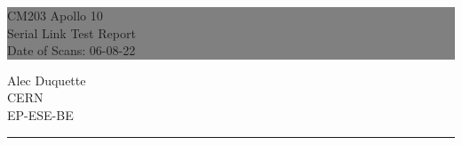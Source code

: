 \documentclass{report}
\newcommand\dateofscans{06-08-22} %
\begin{document}

\begin{titlepage} %
  
  
  \colorbox{grey}{
    \parbox[t]{0.93\textwidth}{ %
      \parbox[t]{0.91\textwidth}{ %
        \raggedleft %
        \fontsize{80pt}{40pt}\selectfont %
        \vspace{0.7cm} %

        CM203 Apollo 10\\
        Serial Link Test Report\\
        Date of Scans: \dateofscans\\
        
        \vspace{0.7cm} %
        }
      }
    }
  
  \vfill %
  
  
  \parbox[t]{0.93\textwidth}{ %
    \raggedleft %
    \large %
    {\Large Alec Duquette}\\[4pt] %
    CERN\\
    EP-ESE-BE\\[4pt] %
    
    \hfill\rule{0.2\linewidth}{1pt}%
    }
  
\end{titlepage}

\hypertarget{MyToc}{}  %
\tableofcontents
\newpage
\end{document}
